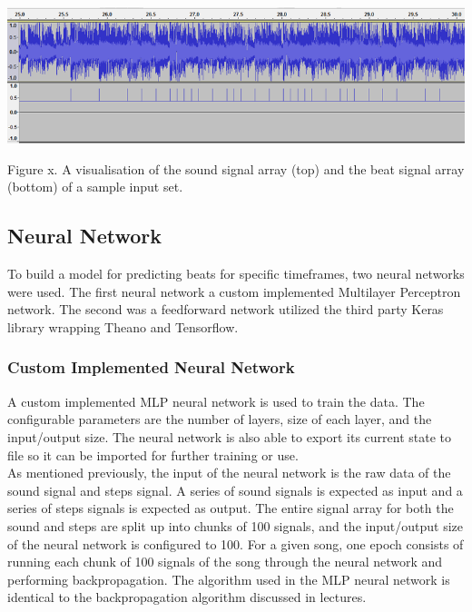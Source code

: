 \includegraphics[scale=0.55]{signal_1.png}

Figure x. A visualisation of the sound signal array (top) and the beat signal array (bottom) of a sample input set.


\subsection{Neural Network}

To build a model for predicting beats for specific timeframes, two neural networks were used. The first neural network a custom implemented Multilayer Perceptron network. The second was a feedforward network utilized the third party Keras library wrapping Theano and Tensorflow.

\subsubsection{Custom Implemented Neural Network}
A custom implemented MLP neural network is used to train the data. The configurable parameters are the number of layers, size of each layer, and the input/output size. The neural network is also able to export its current state to file so it can be imported for further training or use.\\

As mentioned previously, the input of the neural network is the raw data of the sound signal and steps signal. A series of sound signals is expected as input and a series of steps signals is expected as output. The entire signal array for both the sound and steps are split up into chunks of 100 signals, and the input/output size of the neural network is configured to 100. For a given song, one epoch consists of running each chunk of 100 signals of the song through the neural network and performing backpropagation.
The algorithm used in the MLP neural network is identical to the backpropagation algorithm discussed in lectures.\\

